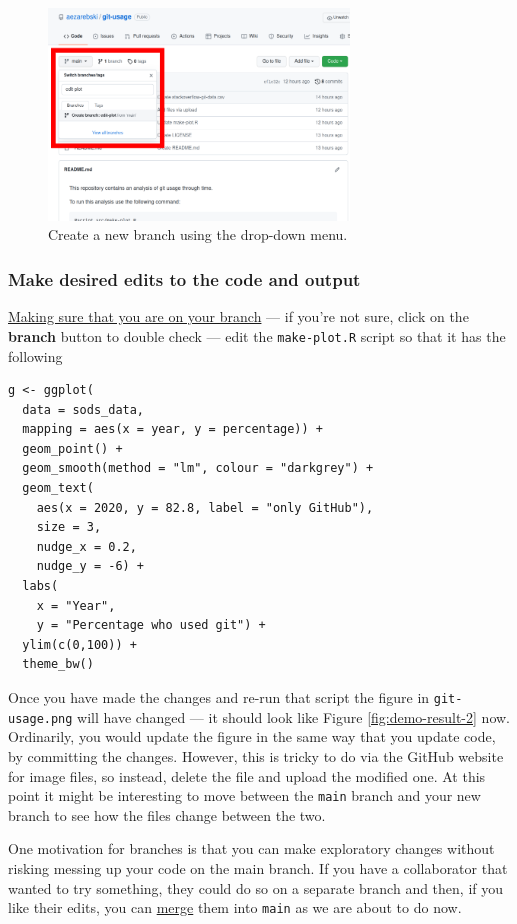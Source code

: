 \documentclass[11pt,onecolumn]{scrartcl}
\begin{document}
\begin{figure}[htbp]
\centering
\includegraphics[width=8cm]{./create-new-branch.png}
\caption{\label{fig:create-new-branch}Create a new branch using the drop-down menu.}
\end{figure}

\subsubsection*{Make desired edits to the code and output}
\label{sec:org2a44935}

\uline{Making sure that you are on your branch} --- if you're not sure, click on the
\textbf{branch} button to double check --- edit the \texttt{make-plot.R} script so that it has the
following

\lstset{language=r,label= ,caption= ,captionpos=b,numbers=none}
\begin{lstlisting}
g <- ggplot(
  data = sods_data,
  mapping = aes(x = year, y = percentage)) +
  geom_point() +
  geom_smooth(method = "lm", colour = "darkgrey") +
  geom_text(
    aes(x = 2020, y = 82.8, label = "only GitHub"),
    size = 3,
    nudge_x = 0.2,
    nudge_y = -6) +
  labs(
    x = "Year",
    y = "Percentage who used git") +
  ylim(c(0,100)) +
  theme_bw()
\end{lstlisting}

Once you have made the changes and re-run that script the figure in
\texttt{git-usage.png} will have changed --- it should look like Figure \ref{fig:demo-result-2}
now. Ordinarily, you would update the figure in the same way that you update
code, by committing the changes. However, this is tricky to do via the GitHub
website for image files, so instead, delete the file and upload the modified
one. At this point it might be interesting to move between the \texttt{main} branch and
your new branch to see how the files change between the two.

One motivation for branches is that you can make exploratory changes without
risking messing up your code on the main branch. If you have a collaborator that
wanted to try something, they could do so on a separate branch and then, if you
like their edits, you can \hyperref[sec:orgce0d2b8]{merge} them into \texttt{main} as we are about to do now.
\end{document}

